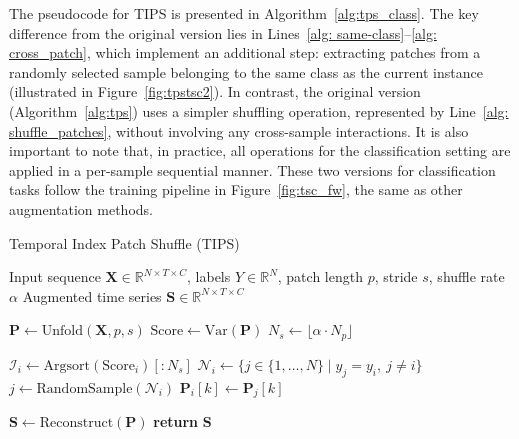The pseudocode for TIPS is presented in Algorithm~\ref{alg:tps_class}. The key difference from the original version lies in Lines~\ref{alg: same-class}–\ref{alg: cross_patch}, which implement an additional step: extracting patches from a randomly selected sample belonging to the same class as the current instance (illustrated in Figure~\ref{fig:tpstsc2}). In contrast, the original version (Algorithm~\ref{alg:tps}) uses a simpler shuffling operation, represented by Line~\ref{alg: shuffle_patches}, without involving any cross-sample interactions. It is also important to note that, in practice, all operations for the classification setting are applied in a per-sample sequential manner. These two versions for classification tasks follow the training pipeline in Figure~\ref{fig:tsc_fw}, the same as other augmentation methods.



\begin{algorithm}[H]
\caption{Temporal Index Patch Shuffle (TIPS)}
\label{alg:tps_class}
\begin{algorithmic}[1]
\REQUIRE Input sequence $\mathbf{X} \in \mathbb{R}^{N \times T \times C}$, labels $Y \in \mathbb{R}^N$, patch length $p$, stride $s$, shuffle rate $\alpha$
\ENSURE Augmented time series $\mathbf{S} \in \mathbb{R}^{N \times T \times C}$

\STATE $\mathbf{P} \gets \text{Unfold}(\mathbf{X}, p, s)$ 
\STATE $\text{Score} \gets \text{Var}(\mathbf{P})$ 
\STATE $N_s \gets \lfloor \alpha \cdot N_p \rfloor$ 

    \STATE $\mathcal{I}_i \gets \text{Argsort}(\text{Score}_i)[:N_s]$ 
    \STATE $\mathcal{N}_i \gets \{ j \in \{1, \dots, N\} \mid y_j = y_i,\ j \ne i \}$  \label{alg: same-class}
        \STATE $j \gets \text{RandomSample}(\mathcal{N}_i)$ 
        \STATE $\mathbf{P}_i[k] \gets \mathbf{P}_j[k]$  \label{alg: cross_patch}
    \ENDFOR
\ENDFOR

\STATE $\mathbf{S} \gets \text{Reconstruct}(\mathbf{P})$ 
\STATE \textbf{return} $\mathbf{S}$
\end{algorithmic}
\end{algorithm}



